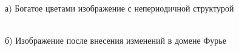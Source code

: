 \documentclass[12pt,a4paper]{article}
\begin{document}
\begin{figure}[h]
\begin{minipage}[h]{0.48\linewidth}
 а) Богатое цветами изображение с непериодичной структурой \\
\end{minipage}
\hfill
\begin{minipage}[h]{0.48\linewidth}
 \\б) Изображение после внесения изменений в домене Фурье

\end{minipage}
\end{figure}
\end{document}
